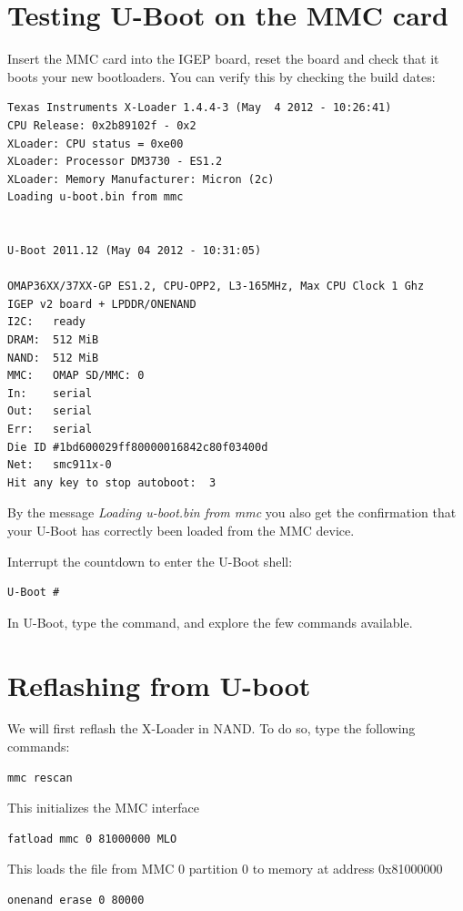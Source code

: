 \section{Testing U-Boot on the MMC card}

Insert the MMC card into the IGEP board, reset the board and check
that it boots your new bootloaders. You can verify this by checking
the build dates:

\begin{verbatim}
Texas Instruments X-Loader 1.4.4-3 (May  4 2012 - 10:26:41)
CPU Release: 0x2b89102f - 0x2
XLoader: CPU status = 0xe00
XLoader: Processor DM3730 - ES1.2
XLoader: Memory Manufacturer: Micron (2c)
Loading u-boot.bin from mmc


U-Boot 2011.12 (May 04 2012 - 10:31:05)

OMAP36XX/37XX-GP ES1.2, CPU-OPP2, L3-165MHz, Max CPU Clock 1 Ghz
IGEP v2 board + LPDDR/ONENAND
I2C:   ready
DRAM:  512 MiB
NAND:  512 MiB
MMC:   OMAP SD/MMC: 0
In:    serial
Out:   serial
Err:   serial
Die ID #1bd600029ff80000016842c80f03400d
Net:   smc911x-0
Hit any key to stop autoboot:  3
\end{verbatim}

By the message {\em Loading u-boot.bin from mmc} you also get the
confirmation that your U-Boot has correctly been loaded from the MMC
device.

Interrupt the countdown to enter the U-Boot shell:
\begin{verbatim}
U-Boot #
\end{verbatim}

In U-Boot, type the  command, and explore the few commands available.

\section{Reflashing from U-boot}

We will first reflash the X-Loader in NAND. To do so, type the following commands:

\begin{verbatim}
mmc rescan
\end{verbatim}

This initializes the MMC interface

\begin{verbatim}
fatload mmc 0 81000000 MLO
\end{verbatim}
This loads the file from MMC 0 partition 0 to memory at address 0x81000000

\begin{verbatim}
onenand erase 0 80000
\end{verbatim}

